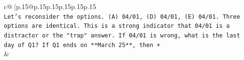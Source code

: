 \documentclass{article}
\begin{document}
{\begin{supertabular}{c@{$\;$}|p{.15\linewidth}@{}p{.15\linewidth}p{.15\linewidth}p{.15\linewidth}p{.15\linewidth}p{.15\linewidth}}
{{{\\ 
\texttt{Let's reconsider the options. (A) 04/01, (D) 04/01, (E) 04/01. Three options are identical. This is a strong indicator that 04/01 is a distractor or the "trap" answer. If 04/01 is wrong, what is the last day of Q1? If Q1 ends on **March 25**, then +} \\
            }
        }
    }
    & \\ \\

\end{supertabular}
}
\end{document}
